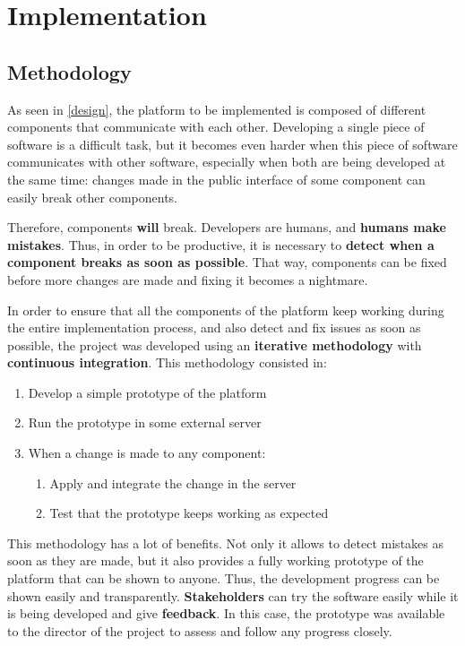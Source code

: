 \documentclass[a4paper,11pt,titlepage,abstract,numbers=noenddot,automark,mnsy,intlimits,rgb,dvipsnames]{report}
\begin{document}
\part{Implementation}
\chapter{Methodology}
As seen in \autoref{design}, the platform to be implemented is composed of different components that communicate with
each other. Developing a single piece of software is a difficult task, but it becomes even harder when this piece of software
communicates with other software, especially when both are being developed at the same time: changes made in
the public interface of some component can easily break other components.

Therefore, components \textbf{will} break. Developers are humans, and \textbf{humans make mistakes}. Thus, in order to be productive,
it is necessary to \textbf{detect when a component breaks as soon as possible}. That way, components can be fixed before more changes
are made and fixing it becomes a nightmare.

In order to ensure that all the components of the platform keep working during the entire implementation process, and also
detect and fix issues as soon as possible, the project was developed using an \textbf{iterative methodology} with
\textbf{continuous integration}. This methodology consisted in:
\begin{enumerate}
\item
Develop a simple prototype of the platform
\item
Run the prototype in some external server
\item
When a change is made to any component:
\begin{enumerate}
\item
Apply and integrate the change in the server
\item
Test that the prototype keeps working as expected
\end{enumerate}
\end{enumerate}
This methodology has a lot of benefits. Not only it allows to detect mistakes as soon as they are made, but it also provides
a fully working prototype of the platform that can be shown to anyone. Thus, the development progress can be shown easily and
transparently. \textbf{Stakeholders} can try the software easily while it is being developed and give \textbf{feedback}. In this case,
the prototype was available to the director of the project to assess and follow any progress closely.
\clearpage
\end{document}
